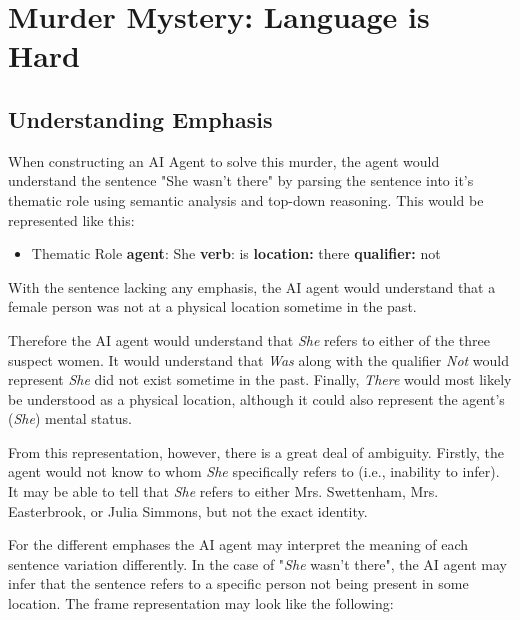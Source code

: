 \section{Murder Mystery: Language is Hard}
\subsection{Understanding Emphasis}
When constructing an AI Agent to solve this murder, the agent would understand the sentence "She wasn't there" by parsing the sentence into it's thematic role using semantic analysis and top-down reasoning. This would be represented like this:
\begin{itemize}
	\item Thematic Role
	\subitem \textbf{agent}: She
	\subitem \textbf{verb}: is
	\subitem \textbf{location:} there
	\subitem \textbf{qualifier:} not
\end{itemize}
With the sentence lacking any emphasis, the AI agent would understand that a female person was not at a physical location sometime in the past.

Therefore the AI agent would understand that \textit{She} refers to either of the three suspect women. It would understand that \textit{Was} along with the qualifier \textit{Not} would represent \textit{She} did not exist sometime in the past. Finally, \textit{There} would most likely be understood as a physical location, although it could also represent the agent's (\textit{She}) mental status.

From this representation, however, there is a great deal of ambiguity. Firstly, the agent would not know to whom \textit{She} specifically refers to (i.e., inability to infer). It may be able to tell that \textit{She} refers to either Mrs. Swettenham, Mrs. Easterbrook, or Julia Simmons, but not the exact identity. 

For the different emphases the AI agent may interpret the meaning of each sentence variation differently. In the case of "\textit{She} wasn't there", the AI agent may infer that the sentence refers to a specific person not being present in some location. The frame representation may look like the following:


